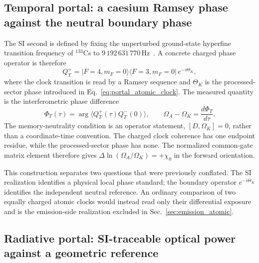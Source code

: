 \documentclass[aps,prd,twocolumn,10pt,superscriptaddress,nofootinbib]{revtex4-2}
\begin{document}
\subsection{Temporal portal: a caesium Ramsey phase against the neutral boundary phase}

The SI second is defined by fixing the unperturbed ground-state hyperfine
transition frequency of $^{133}$Cs to
$9\,192\,631\,770\,\mathrm{Hz}$~\cite{BIPMSI2026}.  A concrete charged phase
operator is therefore
\begin{equation}
 Q_T^+
 =|F=4,m_F=0\rangle\langle F=3,m_F=0|\,e^{-i\Theta_K},
 \label{eq:pb_cs_phase_operator}
\end{equation}
where the clock transition is read by a Ramsey sequence and $\Theta_K$ is
the processed-sector phase introduced in
Eq.~\eqref{eq:portal_atomic_clock}.  The measured quantity is the
interferometric phase difference
\begin{equation}
 \Phi_T(\tau)=\arg\langle Q_T^+(\tau)Q_T^-(0)\rangle,
 \qquad
 \Omega_A-\Omega_K=\frac{d\Phi_T}{d\tau}.
 \label{eq:pb_ramsey_phase_difference}
\end{equation}
The memory-neutrality condition is an operator statement,
$[D,\Omega_K]=0$, rather than a coordinate-time convention.  The charged
clock coherence has one endpoint residue, while the processed-sector phase
has none.  The normalized common-gate matrix element therefore gives
$\Delta\ln(\Omega_A/\Omega_K)=+\chi_0$ in the forward orientation.

This construction separates two questions that were previously conflated.
The SI realization identifies a physical local phase standard; the boundary
operator $e^{-i\Theta_K}$ identifies the independent neutral reference.
An ordinary comparison of two equally charged atomic clocks would instead
read only their differential exposure and is the emission-side realization
excluded in Sec.~\ref{sec:emission_atomic}.

\subsection{Radiative portal: SI-traceable optical power against a geometric reference}
\end{document}

